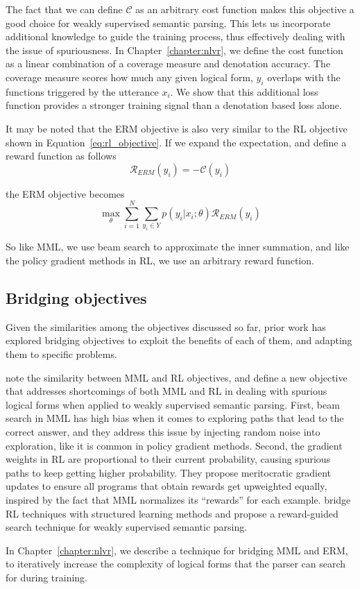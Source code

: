 The fact that we can define $\mathcal{C}$ as an arbitrary cost function makes
this objective a good choice for weakly supervised semantic parsing. This lets
us incorporate additional knowledge to guide the training process,
thus effectively dealing with the issue of spuriousness. In
Chapter~\ref{chapter:nlvr}, we define the cost function as a linear combination
of a coverage measure and denotation accuracy. The coverage measure scores how
much any given logical form, $y_i$ overlaps with the functions triggered by the
utterance $x_i$. We show that this additional loss function provides a 
stronger training signal than a denotation based loss alone.

It may be noted that the ERM objective is also very similar to the RL objective
shown in Equation~\ref{eq:rl_objective}. If we expand the expectation, and 
define a reward function as follows
\begin{equation}
	\mathcal{R}_{ERM}(y_i) = -\mathcal{C}(y_i)
\end{equation}

\noindent the ERM objective becomes
\begin{equation}
	\max_{\theta} \sum_{i=1}^{N} \sum_{y_i \in Y} p(y_i|x_i;\theta)
	\mathcal{R}_{ERM}(y_i) \label{eq:erm_objective2}	
\end{equation}

\noindent So like MML, we use beam search to approximate the inner summation,
and like the policy gradient methods in RL, we use an arbitrary reward function.

\subsection{Bridging objectives}
Given the similarities among the objectives discussed so far, prior work has
explored bridging objectives to exploit the benefits of each
of them, and adapting them to specific problems.

\citet{guu2017bridging} note the
similarity between MML and RL objectives, and define a new objective that
addresses shortcomings of both MML and RL in dealing with spurious logical forms
when applied to weakly supervised semantic parsing. First, beam search in MML
has high bias when it comes to exploring paths that
lead to the correct answer, and they address this issue by injecting random
noise into exploration, like it is common in policy gradient methods. Second,
the gradient weights in RL are proportional to their current probability,
causing spurious paths to keep getting higher probability. They propose
meritocratic gradient updates to ensure all programs that obtain rewards get
upweighted equally, inspired by the fact that MML normalizes its
``rewards'' for each example. \citet{IyyerSQA2016} bridge RL techniques with
structured learning methods and
propose a reward-guided search technique for weakly supervised semantic parsing.

In Chapter~\ref{chapter:nlvr}, we describe a technique for bridging MML and
ERM, to iteratively increase the complexity of logical forms that the parser can
search for during training.
